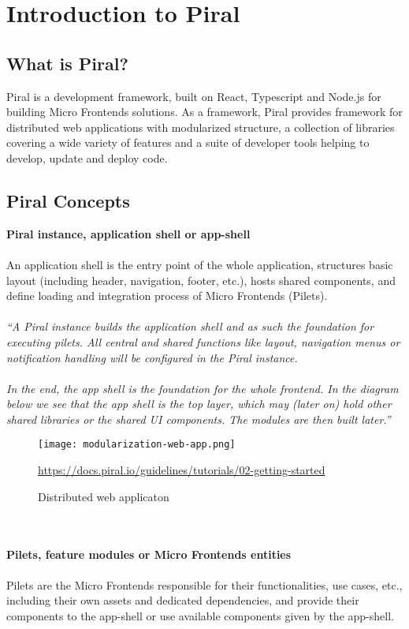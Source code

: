 \documentclass[a4paper]{book}
\begin{document}
\section{Introduction to Piral } \label{Introduction to Piral}
\subsection{What is Piral?}
Piral is a development framework, built on React, Typescript and Node.js for building Micro Frontends solutions. As a framework, Piral provides framework for distributed web applications with modularized structure, a collection of libraries covering a wide variety of features and a suite of developer tools helping to develop, update and deploy code.
\subsection{Piral Concepts}
\textbf{Piral instance, application shell or app-shell}
\\ \\
An application shell is the entry point of the whole application, structures basic layout (including header, navigation, footer, etc.), hosts shared components, and define loading and integration process of Micro Frontends (Pilets).
\\ \\
\textit{“A Piral instance builds the application shell and as such the foundation for executing pilets. All central and shared functions like layout, navigation menus or notification handling will be configured in the Piral instance.
\\ \\ 
In the end, the app shell is the foundation for the whole frontend. In the diagram below we see that the app shell is the top layer, which may (later on) hold other shared libraries or the shared UI components. The modules are then built later.”}
\begin{figure}[h!]
  \centering
  \captionsetup{justification=centering}
  \texttt{[image: modularization-web-app.png]}
  \caption{Distributed web applicaton}
  \url{https://docs.piral.io/guidelines/tutorials/02-getting-started }
  \label{fig:7}
\end{figure}
\\ \\
\textbf{Pilets, feature modules or Micro Frontends entities }
\\ \\
Pilets are the Micro Frontends responsible for their functionalities, use cases, etc., including their own assets and dedicated dependencies, and provide their components to the app-shell or use available components given by the app-shell.
\end{document}
